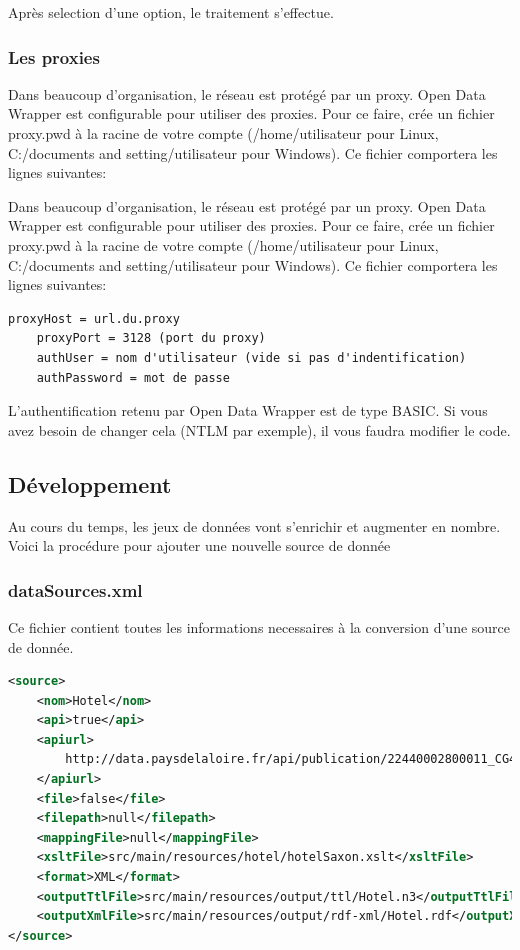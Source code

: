 \documentclass[a4paper]{article}
\begin{document}
Après selection d'une option, le traitement s'effectue.

\subsubsection{Les proxies}

Dans beaucoup d'organisation, le réseau est protégé par un proxy. Open Data
Wrapper est configurable pour utiliser des proxies. Pour ce faire, crée un
fichier proxy.pwd à la racine de votre compte (/home/utilisateur pour Linux,
C:/documents and setting/utilisateur pour Windows). Ce fichier comportera les
lignes suivantes:

Dans beaucoup d'organisation, le réseau est protégé par un proxy. Open Data
Wrapper est configurable pour utiliser des proxies. Pour ce faire, crée un
fichier proxy.pwd à la racine de votre compte (/home/utilisateur pour Linux,
C:/documents and setting/utilisateur pour Windows). Ce fichier comportera les
lignes suivantes:

\begin{lstlisting}[caption=Fichier de configuration des proxys proxy.pwd]
	proxyHost = url.du.proxy
	proxyPort = 3128 (port du proxy)
	authUser = nom d'utilisateur (vide si pas d'indentification)
	authPassword = mot de passe
\end{lstlisting}

L'authentification retenu par Open Data Wrapper est de type BASIC. Si vous avez
besoin de changer cela (NTLM par exemple), il vous faudra modifier le code.

\subsection{Développement}

Au cours du temps, les jeux de données vont s'enrichir et augmenter en nombre.
Voici la procédure pour ajouter une nouvelle source de donnée

\subsubsection{dataSources.xml}

Ce fichier contient toutes les informations necessaires à la conversion d'une
source de donnée.

\begin{lstlisting}[caption=Extrait de dataSources.xml, language=XML]
<source>
	<nom>Hotel</nom>
	<api>true</api>
	<apiurl>
		http://data.paysdelaloire.fr/api/publication/22440002800011_CG44_TOU_04815/hotels_STBL/content?format=xml
	</apiurl>
	<file>false</file>
	<filepath>null</filepath>
	<mappingFile>null</mappingFile>
	<xsltFile>src/main/resources/hotel/hotelSaxon.xslt</xsltFile>
	<format>XML</format>
	<outputTtlFile>src/main/resources/output/ttl/Hotel.n3</outputTtlFile>
	<outputXmlFile>src/main/resources/output/rdf-xml/Hotel.rdf</outputXmlFile>
</source>
\end{lstlisting}
\end{document}

